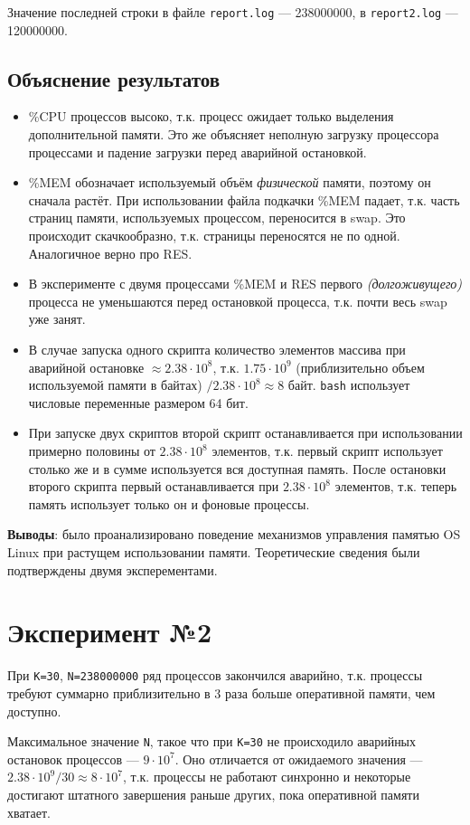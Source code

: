 \documentclass[10pt, a4paper]{article}
\begin{document}
Значение последней строки в файле \texttt{report.log} --- 238000000, в \texttt{report2.log} --- 120000000.

\subsection*{Объяснение результатов}

\begin{itemize}
    \item \%CPU процессов высоко, т.к. процесс ожидает только выделения дополнительной памяти. Это же объясняет неполную загрузку процессора процессами и падение загрузки перед аварийной остановкой.
    \item \%MEM обозначает используемый объём \textit{физической} памяти, поэтому он сначала растёт. При использовании файла подкачки \%MEM падает, т.к. часть страниц памяти, используемых процессом, переносится в swap. Это происходит скачкообразно, т.к. страницы переносятся не по одной. Аналогичное верно про RES.
    \item В эксперименте с двумя процессами \%MEM и RES первого \textit{(долгоживущего)} процесса не уменьшаются перед остановкой процесса, т.к. почти весь swap уже занят.
    \item В случае запуска одного скрипта количество элементов массива при аварийной остановке \(\approx 2.38 \cdot 10^{8}\), т.к. \(1.75 \cdot 10^{9}\) (приблизительно объем используемой памяти в байтах) \(/ 2.38 \cdot 10^8 \approx 8\) байт. \texttt{bash} использует числовые переменные размером 64 бит.
    \item При запуске двух скриптов второй скрипт останавливается при использовании примерно половины от $2.38 \cdot 10^8$ элементов, т.к. первый скрипт использует столько же и в сумме используется вся доступная память. После остановки второго скрипта первый останавливается при $2.38 \cdot 10^8$ элементов, т.к. теперь память использует только он и фоновые процессы.
\end{itemize}

\textbf{Выводы}: было проанализировано поведение механизмов управления памятью OS Linux при растущем использовании памяти. Теоретические сведения были подтверждены двумя эксперементами.

\section*{Эксперимент №2}

При \texttt{K=30}, \texttt{N=238000000} ряд процессов закончился аварийно, т.к. процессы требуют суммарно приблизительно в 3 раза больше оперативной памяти, чем доступно.

Максимальное значение \texttt{N}, такое что при \texttt{K=30} не происходило аварийных остановок процессов --- $9\cdot 10^7$. Оно отличается от ожидаемого значения --- \(2.38\cdot 10^9 / 30 \approx 8\cdot 10^7\), т.к. процессы не работают синхронно и некоторые достигают штатного завершения раньше других, пока оперативной памяти хватает.
\end{document}
